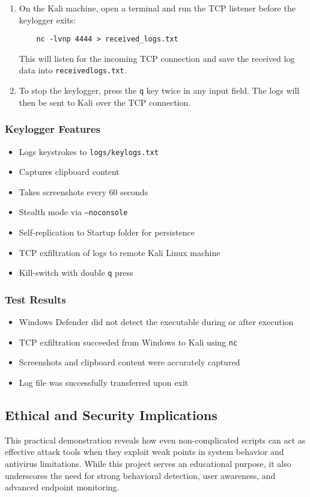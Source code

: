 \begin{enumerate}
    \item On the Kali machine, open a terminal and run the TCP listener before the keylogger exits:
    \begin{verbatim}
    nc -lvnp 4444 > received_logs.txt
    \end{verbatim}
    This will listen for the incoming TCP connection and save the received log data into \texttt{receivedlogs.txt}.

    \item To stop the keylogger, press the \texttt{q} key twice in any input field. The logs will then be sent to Kali over the TCP connection.
\end{enumerate}

\subsubsection{Keylogger Features}
\begin{itemize}
    \item Logs keystrokes to \texttt{logs/keylogs.txt}
    \item Captures clipboard content
    \item Takes screenshots every 60 seconds
    \item Stealth mode via \texttt{--noconsole}
    \item Self-replication to Startup folder for persistence
    \item TCP exfiltration of logs to remote Kali Linux machine
    \item Kill-switch with double \texttt{q} press
\end{itemize}

\subsubsection{Test Results}
\begin{itemize}
    \item Windows Defender did not detect the executable during or after execution
    \item TCP exfiltration succeeded from Windows to Kali using \texttt{nc}
    \item Screenshots and clipboard content were accurately captured
    \item Log file was successfully transferred upon exit
\end{itemize}

\subsection{Ethical and Security Implications}
This practical demonstration reveals how even non-complicated scripts can act as effective attack tools when they exploit weak points in system behavior and antivirus limitations. While this project serves an educational purpose, it also underscores the need for strong behavioral detection, user awareness, and advanced endpoint monitoring.

